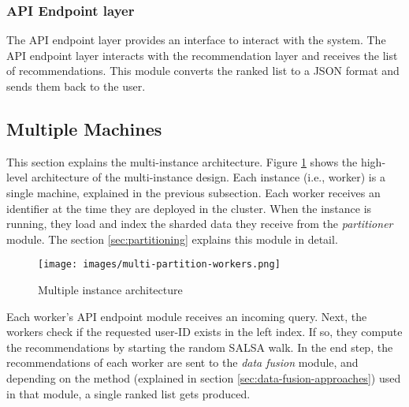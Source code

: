 \subsubsection{API Endpoint layer}
\label{subsubsec:api-endpoint-layer}
The API endpoint layer provides an interface to interact with the system. The API endpoint layer interacts with the recommendation layer and receives the list of recommendations. This module converts the ranked list to a JSON format and sends them back to the user. 

\subsection{Multiple Machines}
\label{Multiple Machines}
This section explains the multi-instance architecture. Figure \ref{fig:multiple-machine-architecture} shows the high-level architecture of the multi-instance design. Each instance (i.e., worker) is a single machine, explained in the previous subsection. Each worker receives an identifier at the time they are deployed in the cluster. When the instance is running, they load and index the sharded data they receive from the \emph{partitioner} module. The section \ref{sec:partitioning} explains this module in detail. 



\begin{figure}[!h]
	\centering
	\texttt{[image: images/multi-partition-workers.png]}
	\caption{Multiple instance architecture}
	\label{fig:multiple-machine-architecture}
\end{figure}


Each worker's API endpoint module receives an incoming query. Next, the workers check if the requested user-ID exists in the left index. If so, they compute the recommendations by starting the random SALSA walk. In the end step, the recommendations of each worker are sent to the \emph{data fusion} module, and depending on the method (explained in section \ref{sec:data-fusion-approaches}) used in that module, a single ranked list gets produced.

